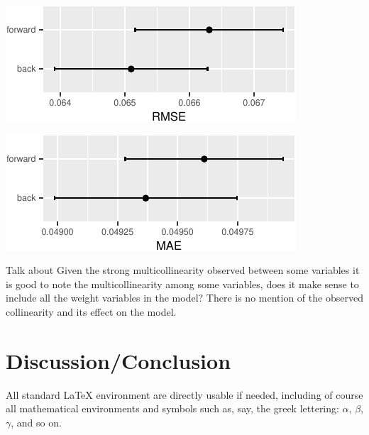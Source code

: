 \documentclass[letterpaper,9pt,twocolumn,twoside,]{pinp}
\begin{document}
\begin{center}\includegraphics{ExecSum_files/figure-latex/unnamed-chunk-10-1} \end{center}

\begin{center}\includegraphics{ExecSum_files/figure-latex/unnamed-chunk-11-1} \end{center}

Talk about Given the strong multicollinearity observed between some
variables it is good to note the multicollinearity among some variables,
does it make sense to include all the weight variables in the model?
There is no mention of the observed collinearity and its effect on the
model.

\section{Discussion/Conclusion}\label{discussionconclusion}

All standard LaTeX environment are directly usable if needed, including
of course all mathematical environments and symbols such as, say, the
greek lettering: \(\alpha\), \(\beta\), \(\gamma\), and so on.


\pnasbreak 
\end{document}
